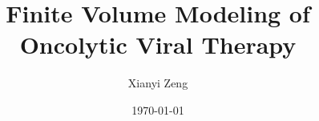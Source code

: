 \documentclass[reqno]{amsart}
\theoremstyle{definition}
\theoremstyle{remark}
\numberwithin{equation}{section}
\numberwithin{figure}{section}
\begin{document}
\title[Numerical Oncolytic Dynamics]{Finite Volume Modeling of Oncolytic Viral Therapy}
\author[X.~Zeng]{Xianyi Zeng}
\address{Department of Mathematics, Lehigh University, Bethlehem PA 18015, United States. \\    
         Tel.: +1-610-758-3745}
\date{\today}




\maketitle
\end{document}
